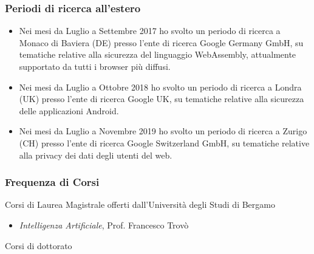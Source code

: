 \documentclass{article}
\begin{document}
\subsubsection*{Periodi di ricerca all'estero}

\begin{itemize}
	\item Nei mesi da Luglio a Settembre 2017 ho svolto un periodo di ricerca a Monaco di Baviera (DE) presso l'ente di ricerca Google Germany GmbH, su tematiche relative alla sicurezza del linguaggio WebAssembly, attualmente supportato da tutti i browser più diffusi.
	\item Nei mesi da Luglio a Ottobre 2018 ho svolto un periodo di ricerca a Londra (UK) presso l'ente di ricerca Google UK, su tematiche relative alla sicurezza delle applicazioni Android.
	\item Nei mesi da Luglio a Novembre 2019 ho svolto un periodo di ricerca a Zurigo (CH) presso l'ente di ricerca Google Switzerland GmbH, su tematiche relative alla privacy dei dati degli utenti del web.
\end{itemize}


\subsubsection*{Frequenza di Corsi}

\noindent Corsi di Laurea Magistrale offerti dall'Università degli Studi di Bergamo

\begin{itemize}
	\item \textit{Intelligenza Artificiale}, Prof. Francesco Trovò
\end{itemize}

\smallskip
\noindent Corsi di dottorato

\end{document}
